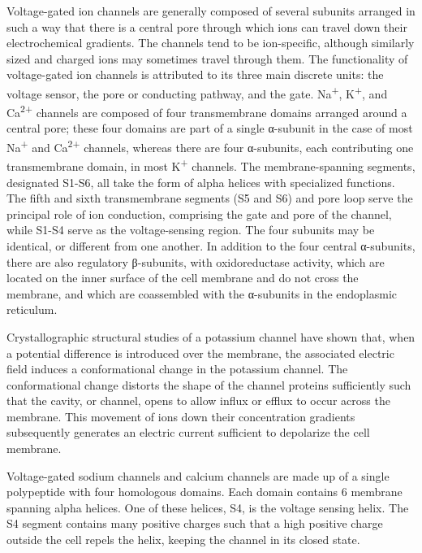 Voltage-gated ion channels are generally composed of several subunits arranged in such a way that there is a central pore through which ions can travel down their electrochemical gradients. The channels tend to be ion-specific, although similarly sized and charged ions may sometimes travel through them. The functionality of voltage-gated ion channels is attributed to its three main discrete units: the voltage sensor, the pore or conducting pathway, and the gate. Na\textsuperscript{+}, K\textsuperscript{+}, and Ca\textsuperscript{2+} channels are composed of four transmembrane domains arranged around a central pore; these four domains are part of a single α-subunit in the case of most Na\textsuperscript{+} and Ca\textsuperscript{2+} channels, whereas there are four α-subunits, each contributing one transmembrane domain, in most K\textsuperscript{+} channels. The membrane-spanning segments, designated S1-S6, all take the form of alpha helices with specialized functions. The fifth and sixth transmembrane segments (S5 and S6) and pore loop serve the principal role of ion conduction, comprising the gate and pore of the channel, while S1-S4 serve as the voltage-sensing region. The four subunits may be identical, or different from one another. In addition to the four central α-subunits, there are also regulatory β-subunits, with oxidoreductase activity, which are located on the inner surface of the cell membrane and do not cross the membrane, and which are coassembled with the α-subunits in the endoplasmic reticulum.

Crystallographic structural studies of a potassium channel have shown that, when a potential difference is introduced over the membrane, the associated electric field induces a conformational change in the potassium channel. The conformational change distorts the shape of the channel proteins sufficiently such that the cavity, or channel, opens to allow influx or efflux to occur across the membrane. This movement of ions down their concentration gradients subsequently generates an electric current sufficient to depolarize the cell membrane.

Voltage-gated sodium channels and calcium channels are made up of a single polypeptide with four homologous domains. Each domain contains 6 membrane spanning alpha helices. One of these helices, S4, is the voltage sensing helix. The S4 segment contains many positive charges such that a high positive charge outside the cell repels the helix, keeping the channel in its closed state.

